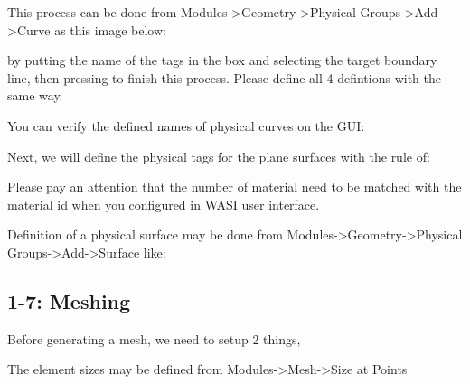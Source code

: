 \documentclass[letterpaper,10pt,english]{sphinxmanual}
\begin{document}
This process can be done from  Modules-\textgreater{}Geometry-\textgreater{}Physical Groups-\textgreater{}Add-\textgreater{}Curve as this image below:



by putting the name of the tags in the box and selecting the target boundary line, then pressing  to finish this process. Please define all 4 defintions with the same way.

You can verify the defined names of physical curves on the GUI:



Next, we will define the physical tags for the plane surfaces with the rule of:

\begin{sphinxVerbatim}[commandchars=\\\{\}]
      
    
    
\end{sphinxVerbatim}

Please pay an attention that the number of material need to be matched with the material id when you configured in WASI user interface.

Definition of a physical surface may be done from Modules-\textgreater{}Geometry-\textgreater{}Physical Groups-\textgreater{}Add-\textgreater{}Surface like:




\subsection{1-7: Meshing}
\label{\detokenize{meshing:meshing}}
Before generating a mesh, we need to setup 2 things,

\begin{sphinxVerbatim}[commandchars=\\\{\}]
    
        
\end{sphinxVerbatim}

The element sizes may be defined from Modules-\textgreater{}Mesh-\textgreater{}Size at Points
\end{document}
